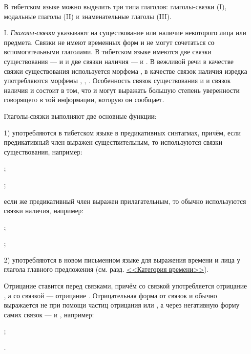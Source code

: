 В тибетском языке можно выделить три типа глаголов: глаголы-связки (I), модальные глаголы (II) и знаменательные глаголы (III).

I. \emph{Глаголы-связки} указывают на существование или наличие некоторого лица или предмета. Связки не имеют временных форм и не могут сочетаться со вспомогательными глаголами. В тибетском языке имеются две связки существования ---  и  и две связки наличия ---  и . В вежливой речи в качестве связки существования используется морфема , в качестве связок наличия изредка употребляются морфемы , , . Особенность связок существования  и  и связок наличия  и  состоит в том, что  и  могут выражать большую степень уверенности говорящего в той информации, которую он сообщает.

Глаголы-связки выполняют две основные функции:

1) употребляются в тибетском языке в предикативных синтагмах, причём, если предикативный член выражен существительным, то используются связки существования, например:
\begin{prfsample}
	\item {};
	\item {};
\end{prfsample}
если же предикативный член выражен прилагательным, то обычно используются связки наличия, например:
\begin{prfsample}
	\item {};
	\item {};
\end{prfsample}

2) употребляются в новом письменном языке для выражения времени и лица у глагола главного предложения (см. разд. \hyperref[sec:glagol:kat_vremeni]{<<Категория времени>>}).

Отрицание ставится перед связками, причём со связкой  употребляется отрицание , а со связкой  --- отрицание . Отрицательная форма от связок  и  обычно выражается не при помощи частиц отрицания  или , а через негативную форму самих связок ---  и , например:
\begin{prfsample}
	\item {};
	\item {}.
\end{prfsample}

